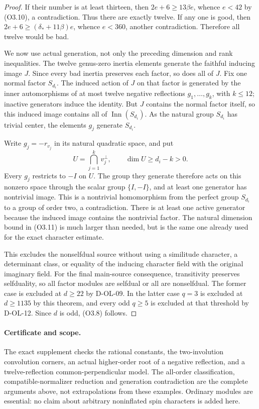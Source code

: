 \begin{proof}
If their number is at least thirteen, then
$2e+6\ge13\beta e$, whence $e<42$ by (O3.10), a contradiction.
Thus there are exactly twelve.  If any one is good, then
$2e+6\ge(\delta_*+11\beta)e$, whence $e<360$, another
contradiction.  Therefore all twelve would be bad.

We now use actual generation, not only the preceding dimension
and rank inequalities.  The twelve genus-zero inertia elements
generate the faithful inducing image $J$.  Since every bad
inertia preserves each factor, so does all of $J$.  Fix one
normal factor $S_{d_i}$.  The induced action of $J$ on that
factor is generated by the inner automorphisms of at most
twelve negative reflections $g_1,\ldots,g_k$, with $k\le12$;
inactive generators induce the identity.  But $J$ contains
the normal factor itself, so this induced image contains
all of $\operatorname{Inn}(S_{d_i})$.  As the natural group
$S_{d_i}$ has trivial center, the elements $g_j$ generate
$S_{d_i}$.

Write $g_j=-r_{v_j}$ in its natural quadratic space, and put
\[
              U=\bigcap_{j=1}^k v_j^\perp,
                     \qquad \dim U\ge d_i-k>0.             \tag{O3.11}
\]
Every $g_j$ restricts to $-I$ on $U$.  The group they generate
therefore acts on this nonzero space through the scalar
group $\{I,-I\}$, and at least one generator has nontrivial
image.  This is a nontrivial homomorphism from the perfect
group $S_{d_i}$ to a group of order two, a contradiction.
There is at least one active generator because the induced
image contains the nontrivial factor.  The natural dimension
bound in (O3.11) is much larger than needed, but is the same
one already used for the exact character estimate.

This excludes the nonselfdual source without using a
similitude character, a determinant class, or equality of the
inducing character field with the original imaginary field.
For the final main-source consequence, transitivity preserves
selfduality, so all factor modules are selfdual or all are
nonselfdual.  The former case is excluded at $d\ge22$ by
D-OL-09.  In the latter case $q=3$ is excluded at $d\ge1135$
by this theorem, and every odd $q\ge5$ is excluded at that
threshold by D-OL-12.  Since $d$ is odd, (O3.8) follows.
\end{proof}

\paragraph{Certificate and scope.}
The exact supplement checks the rational constants, the
two-involution convolution corners, an actual higher-order
root of a negative reflection, and a twelve-reflection
common-perpendicular model.  The all-order classification,
compatible-normalizer reduction and generation contradiction
are the complete arguments above, not extrapolations from
these examples.  Ordinary modules are essential: no claim
about arbitrary noninflated spin characters is added here.
